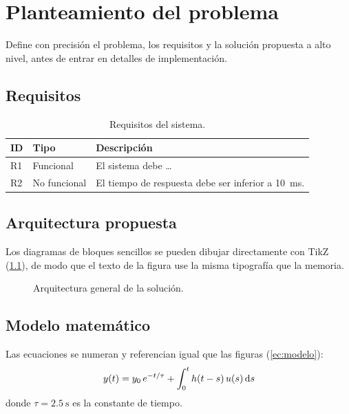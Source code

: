 \chapter{Planteamiento del problema}\label{cap:planteamiento}

Define con precisión el problema, los requisitos y la solución propuesta
a alto nivel, antes de entrar en detalles de implementación.

\section{Requisitos}

\begin{table}[H]
  \centering
  \caption{Requisitos del sistema.}
  \label{tab:requisitos}
  \begin{tabularx}{\linewidth}{llX}
    \toprule
    ID & Tipo & Descripción \\
    \midrule
    R1 & Funcional    & El sistema debe \ldots \\
    R2 & No funcional & El tiempo de respuesta debe ser inferior a \qty{10}{\milli\second}. \\
    \bottomrule
  \end{tabularx}
\end{table}

\section{Arquitectura propuesta}

Los diagramas de bloques sencillos se pueden dibujar directamente con
TikZ (\cref{fig:arquitectura}), de modo que el texto de la figura use la
misma tipografía que la memoria.

\begin{figure}[H]
  \centering
  \caption{Arquitectura general de la solución.}
  \label{fig:arquitectura}
\end{figure}

\section{Modelo matemático}

Las ecuaciones se numeran y referencian igual que las figuras
(\cref{ec:modelo}):
\begin{equation}
  \label{ec:modelo}
  y(t) = y_0 \, e^{-t/\tau} + \int_0^t h(t-s)\, u(s) \mathop{}\!\mathrm{d} s
\end{equation}
donde $\tau = \qty{2.5}{\second}$ es la constante de tiempo.
